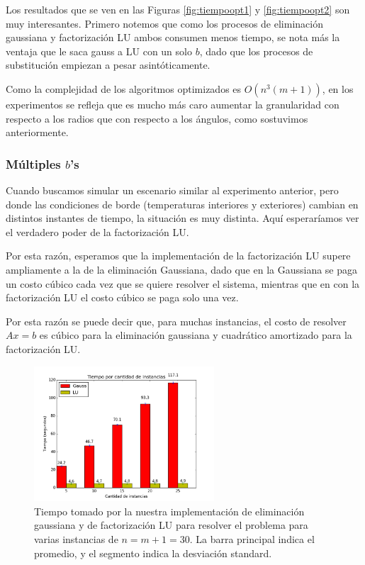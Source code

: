 Los resultados que se ven en las Figuras \ref{fig:tiempoopt1} y \ref{fig:tiempoopt2} son muy interesantes. Primero notemos que como los procesos de eliminación gaussiana y factorización LU ambos consumen menos tiempo, se nota más la ventaja que le saca gauss a LU con un solo $b$, dado que los procesos de substitución empiezan a pesar asintóticamente.


Como la complejidad de los algoritmos optimizados es $O(n^3(m+1))$, en los experimentos se refleja que es mucho más caro aumentar la granularidad con respecto a los radios que con respecto a los ángulos, como sostuvimos anteriormente.

\subsubsection{Múltiples $b$'s}

Cuando buscamos simular un escenario similar al experimento anterior, pero donde las condiciones de borde (temperaturas interiores y exteriores) cambian en distintos instantes de tiempo, la situación es muy distinta. Aquí esperaríamos ver el verdadero poder de la factorización LU.

Por esta razón, esperamos que la implementación de la factorización LU supere ampliamente a la de la eliminación Gaussiana, dado que en la Gaussiana se paga un costo cúbico cada vez que se quiere resolver el sistema, mientras que en con la factorización LU el costo cúbico se paga solo una vez.

Por esta razón se puede decir que, para muchas instancias, el costo de resolver $Ax = b$ es cúbico para la eliminación gaussiana y cuadrático amortizado para la factorización LU.

\begin{figure}[H]
\centering  
 \includegraphics[width=0.6\textwidth]{imgs/tiempos_ninst.png}
 \caption{\footnotesize{Tiempo tomado por la nuestra implementación de eliminación gaussiana y de factorización LU para resolver el problema para varias instancias de $n = m+1 = 30$. La barra principal indica el promedio, y el segmento indica la desviación standard.}}
\label{fig:tiemponinst}
\end{figure}



